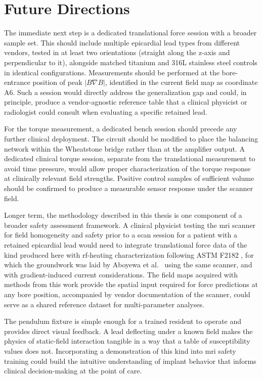 \section{Future Directions}

The immediate next step is a dedicated translational force session with a broader sample set. This should include multiple epicardial lead types from different vendors, tested in at least two orientations (straight along the z-axis and perpendicular to it), alongside matched titanium and 316L stainless steel controls in identical configurations. Measurements should be performed at the bore-entrance position of peak $|B\nabla B|$, identified in the current field map as coordinate A6. Such a session would directly address the generalization gap and could, in principle, produce a vendor-agnostic reference table that a clinical physicist or radiologist could consult when evaluating a specific retained lead.

For the torque measurement, a dedicated bench session should precede any further clinical deployment. The circuit should be modified to place the balancing network within the Wheatstone bridge rather than at the amplifier output. A dedicated clinical torque session, separate from the translational measurement to avoid time pressure, would allow proper characterization of the torque response at clinically relevant field strengths. Positive control samples of sufficient volume should be confirmed to produce a measurable sensor response under the scanner field. 

Longer term, the methodology described in this thesis is one component of a broader safety assessment framework. A clinical physicist testing the \gls{mri} scanner for field homogeneity and  safety prior to a scan session for a patient with a retained epicardial lead would need to integrate translational force data of the kind produced here with \gls{rf}-heating characterization following ASTM F2182 \cite{astmF2182}, for which the groundwork was laid by Aboyewa et al.\ \cite{aboyewa2021} using the same scanner, and with gradient-induced current considerations. The field maps acquired with methods from this work provide the spatial input required for force predictions at any bore position, accompanied by vendor documentation of the scanner, could serve as a shared reference dataset for multi-parameter analyses.

The pendulum fixture is simple enough for a trained resident to operate and provides direct visual feedback. A lead deflecting under a known field makes the physics of static-field interaction tangible in a way that a table of susceptibility values does not. Incorporating a demonstration of this kind into \gls{mri} safety training could build the intuitive understanding of implant behavior that informs clinical decision-making at the point of care.

